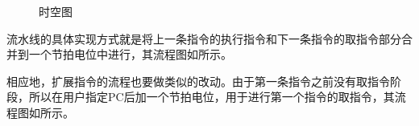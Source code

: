 \documentclass[lang=cn,11pt,a4paper,cite=authornum]{paper}
\begin{document}
\begin{figure}[htbp]
    \caption{时空图}
\end{figure}

流水线的具体实现方式就是将上一条指令的执行指令和下一条指令的取指令部分合并到一个节拍电位中进行，其流程图如所示。

相应地，扩展指令的流程也要做类似的改动。由于第一条指令之前没有取指令阶段，所以在用户指定PC后加一个节拍电位，用于进行第一个指令的取指令，其流程图如所示。
\end{document}
